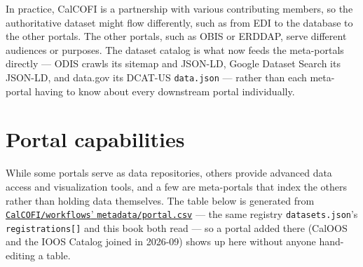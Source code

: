 \documentclass[
  letterpaper,
  DIV=11,
  numbers=noendperiod]{scrreprt}
\begin{document}
In practice, CalCOFI is a partnership with various contributing members,
so the authoritative dataset might flow differently, such as from EDI to
the database to the other portals. The other portals, such as OBIS or
ERDDAP, serve different audiences or purposes. The dataset catalog is
what now feeds the meta-portals directly --- ODIS crawls its sitemap and
JSON-LD, Google Dataset Search its JSON-LD, and data.gov its DCAT-US
\texttt{data.json} --- rather than each meta-portal having to know about
every downstream portal individually.

\section{Portal capabilities}\label{portal-capabilities}

While some portals serve as data repositories, others provide advanced
data access and visualization tools, and a few are meta-portals that
index the others rather than holding data themselves. The table below is
generated from
\href{https://github.com/CalCOFI/workflows/blob/main/metadata/portal.csv}{\texttt{CalCOFI/workflows}'
\texttt{metadata/portal.csv}} --- the same registry
\texttt{datasets.json}'s \texttt{registrations{[}{]}} and this book both
read --- so a portal added there (CalOOS and the IOOS Catalog joined in
2026-09) shows up here without anyone hand-editing a table.
\end{document}
